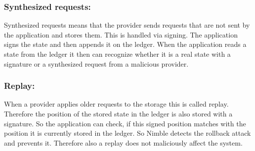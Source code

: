 	\subsubsection*{Synthesized requests:} Synthesized requests means that the provider sends requests that are not sent by the application and stores them. This is handled via signing. The application signs the state and then appends it on the ledger. When the application reads a state from the ledger it then can recognize whether it is a real state with a signature or a synthesized request from a malicious provider.
	\subsubsection*{Replay:} When a provider applies older requests to the storage this is called replay. Therefore the position of the stored state in the ledger is also stored with a signature. So the application can check, if this signed position matches with the position it is currently stored in the ledger. So Nimble detects the rollback attack and prevents it. Therefore also a replay does not maliciously affect the system.\\
	
